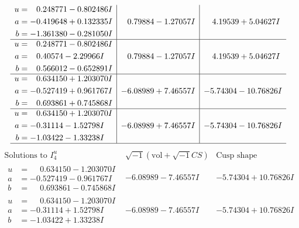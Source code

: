 \documentclass[1p]{elsarticle_modified}
\theoremstyle{definition}
\newcommand{\I}{\sqrt{-1}}
\begin{document}
$$\begin{array}{c|c|c}
\begin{aligned}
u &= \phantom{-}0.248771 - 0.802486 I \\
a &= -0.419648 + 0.132335 I \\
b &= -1.361380 - 0.281050 I\end{aligned}
 & \phantom{-}0.79884 - 1.27057 I & \phantom{-}4.19539 + 5.04627 I \\ \hline\begin{aligned}
u &= \phantom{-}0.248771 - 0.802486 I \\
a &= \phantom{-}0.40574 - 2.29966 I \\
b &= \phantom{-}0.566012 - 0.652891 I\end{aligned}
 & \phantom{-}0.79884 - 1.27057 I & \phantom{-}4.19539 + 5.04627 I \\ \hline\begin{aligned}
u &= \phantom{-}0.634150 + 1.203070 I \\
a &= -0.527419 + 0.961767 I \\
b &= \phantom{-}0.693861 + 0.745868 I\end{aligned}
 & -6.08989 + 7.46557 I & -5.74304 - 10.76826 I \\ \hline\begin{aligned}
u &= \phantom{-}0.634150 + 1.203070 I \\
a &= -0.31114 - 1.52798 I \\
b &= -1.03422 - 1.33238 I\end{aligned}
 & -6.08989 + 7.46557 I & -5.74304 - 10.76826 I\\
 \hline 
 \end{array}$$\newpage$$\begin{array}{c|c|c}  
\text{Solutions to }I^u_{4}& \I (\text{vol} + \sqrt{-1}CS) & \text{Cusp shape}\\
 \hline 
\begin{aligned}
u &= \phantom{-}0.634150 - 1.203070 I \\
a &= -0.527419 - 0.961767 I \\
b &= \phantom{-}0.693861 - 0.745868 I\end{aligned}
 & -6.08989 - 7.46557 I & -5.74304 + 10.76826 I \\ \hline\begin{aligned}
u &= \phantom{-}0.634150 - 1.203070 I \\
a &= -0.31114 + 1.52798 I \\
b &= -1.03422 + 1.33238 I\end{aligned}
 & -6.08989 - 7.46557 I & -5.74304 + 10.76826 I \\ \hline\begin{aligned}

\end{aligned}
\end{array}$$
\end{document}
